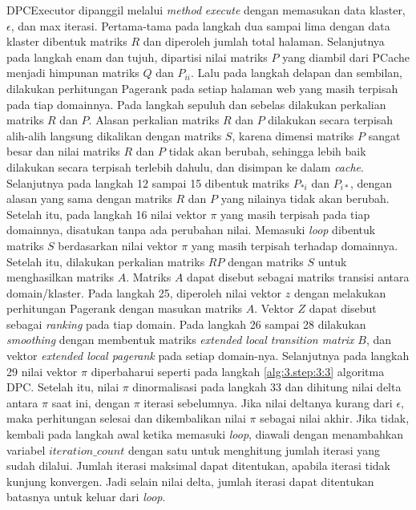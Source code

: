 DPCExecutor dipanggil melalui \textit{method} \textit{execute} dengan memasukan data klaster, $\epsilon$, dan max iterasi. Pertama-tama pada langkah dua sampai lima dengan data klaster dibentuk matriks $R$ dan diperoleh jumlah total halaman. Selanjutnya pada langkah enam dan tujuh, dipartisi nilai matriks $P$ yang diambil dari PCache menjadi himpunan matriks $Q$ dan $P_{ii}$. Lalu pada langkah delapan dan sembilan, dilakukan perhitungan Pagerank pada setiap halaman web yang masih terpisah pada tiap domainnya. Pada langkah sepuluh dan sebelas dilakukan perkalian matriks $R$ dan $P$. Alasan perkalian matriks $R$ dan $P$ dilakukan secara terpisah alih-alih langsung dikalikan dengan matriks $S$, karena dimensi matriks $P$ sangat besar dan nilai matriks $R$ dan $P$ tidak akan berubah, sehingga lebih baik dilakukan secara terpisah terlebih dahulu, dan disimpan ke dalam \textit{cache}. Selanjutnya pada langkah 12 sampai 15 dibentuk matriks $P_{*i}$ dan $P_{i*}$, dengan alasan yang sama dengan matriks $R$ dan $P$ yang nilainya tidak akan berubah. Setelah itu, pada langkah 16 nilai vektor $\pi$ yang masih terpisah pada tiap domainnya, disatukan tanpa ada perubahan nilai. Memasuki \textit{loop} dibentuk matriks $S$ berdasarkan nilai vektor $\pi$ yang masih terpisah terhadap domainnya. Setelah itu, dilakukan perkalian matriks $RP$ dengan matriks $S$ untuk menghasilkan matriks $A$. Matriks $A$ dapat disebut sebagai matriks transisi antara domain/klaster. Pada langkah 25, diperoleh nilai vektor $z$ dengan melakukan perhitungan Pagerank dengan masukan matriks $A$. Vektor $Z$ dapat disebut sebagai \textit{ranking} pada tiap domain. Pada langkah 26 sampai 28 dilakukan \textit{smoothing} dengan membentuk matriks \textit{extended local transition matrix} $B$, dan vektor \textit{extended local pagerank} pada setiap domain-nya. Selanjutnya pada langkah 29 nilai vektor $\pi$ diperbaharui seperti pada langkah \ref{alg:3.step:3:3} algoritma DPC. Setelah itu, nilai $\pi$ dinormalisasi pada langkah 33 dan dihitung nilai delta antara $\pi$ saat ini, dengan $\pi$ iterasi sebelumnya. Jika nilai deltanya kurang dari $\epsilon$, maka perhitungan selesai dan dikembalikan nilai $\pi$ sebagai nilai akhir. Jika tidak, kembali pada langkah awal ketika memasuki \textit{loop}, diawali dengan menambahkan variabel $iteration\_count$ dengan satu untuk menghitung jumlah iterasi yang sudah dilalui. Jumlah iterasi maksimal dapat ditentukan, apabila iterasi tidak kunjung konvergen. Jadi selain nilai delta, jumlah iterasi dapat ditentukan batasnya untuk keluar dari \textit{loop}.

